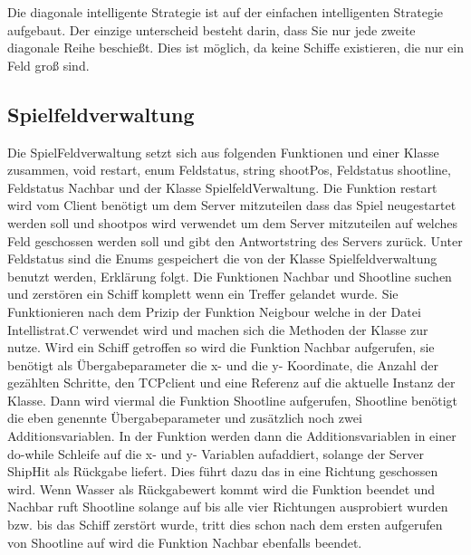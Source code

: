 Die diagonale intelligente Strategie ist auf der einfachen intelligenten Strategie aufgebaut. Der einzige unterscheid besteht darin, dass Sie nur jede zweite diagonale Reihe beschießt. Dies ist möglich, da keine Schiffe existieren, die nur ein Feld groß sind.

\subsection*{Spielfeldverwaltung}

Die SpielFeldverwaltung setzt sich aus folgenden Funktionen und einer Klasse zusammen,
void restart, enum Feldstatus, string shootPos, Feldstatus shootline, Feldstatus Nachbar und der Klasse SpielfeldVerwaltung.
Die Funktion restart wird vom Client benötigt um dem Server mitzuteilen dass das Spiel neugestartet werden soll und shootpos wird verwendet um dem Server mitzuteilen auf welches Feld 
geschossen werden soll und gibt den Antwortstring des Servers zurück. Unter Feldstatus sind die Enums gespeichert die von der Klasse Spielfeldverwaltung benutzt werden, Erklärung 
folgt. Die Funktionen Nachbar und Shootline suchen und zerstören ein Schiff komplett wenn ein Treffer gelandet wurde. Sie Funktionieren nach dem Prizip der Funktion Neigbour welche 
in der Datei Intellistrat.C verwendet wird und machen sich die Methoden der Klasse zur nutze. Wird ein Schiff getroffen so wird die Funktion Nachbar aufgerufen, sie benötigt als 
Übergabeparameter die x- und die y- Koordinate, die Anzahl der gezählten Schritte, den TCPclient und eine Referenz auf die aktuelle Instanz der Klasse. Dann wird viermal die Funktion 
Shootline aufgerufen, Shootline benötigt die eben genennte Übergabeparameter und zusätzlich noch zwei Additionsvariablen. In der Funktion werden dann die Additionsvariablen in einer 
do-while Schleife auf die x- und y- Variablen aufaddiert, solange der Server ShipHit als Rückgabe liefert. Dies führt dazu das in eine Richtung geschossen wird. Wenn Wasser als 
Rückgabewert kommt wird die Funktion beendet und Nachbar ruft Shootline solange auf bis alle vier Richtungen ausprobiert wurden bzw. bis das Schiff zerstört wurde, tritt dies schon 
nach dem ersten aufgerufen von Shootline auf wird die Funktion Nachbar ebenfalls beendet.

